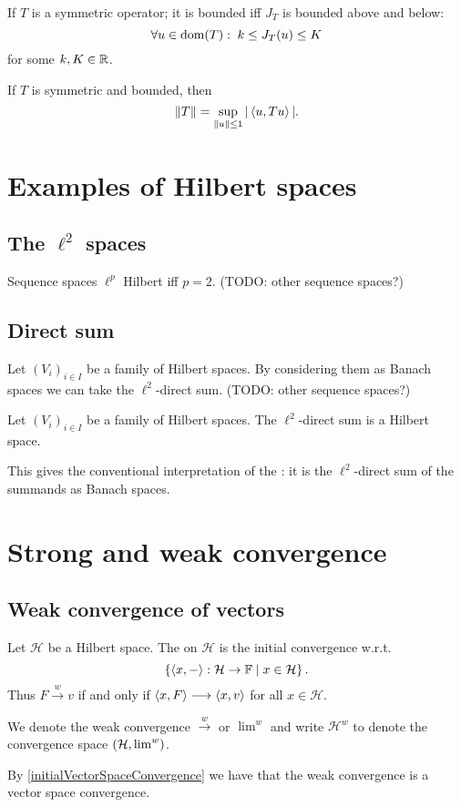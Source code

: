 \begin{corollary}
If $T$ is a symmetric operator; it is bounded iff $J_T$ is bounded above and below:
\[ \forall u\in\operatorname{dom}(T): \; k \leq J_T(u) \leq K \]
for some $k,K\in \mathbb{R}$.
\end{corollary}
\begin{corollary}
If $T$ is symmetric and bounded, then
\[ \lVert T\rVert = \sup_{\lVert u\rVert\leq 1} |\left\langle u,Tu \right\rangle|. \]
\end{corollary}








\section{Examples of Hilbert spaces}
\subsection{The $\ell^2$ spaces}
Sequence spaces $\ell^p$ Hilbert iff $p=2$. (TODO: other sequence spaces?)

\subsection{Direct sum}
Let $(V_i)_{i\in I}$ be a family of Hilbert spaces. By considering them as Banach spaces we can take the $\ell^2$-direct sum. (TODO: other sequence spaces?)
\begin{proposition}
Let $(V_i)_{i\in I}$ be a family of Hilbert spaces. The $\ell^2$-direct sum is a Hilbert space.
\end{proposition}
This gives the conventional interpretation of the : it is the $\ell^2$-direct sum of the summands as Banach spaces.

\section{Strong and weak convergence}
\subsection{Weak convergence of vectors}
\begin{definition}
Let $\mathcal{H}$ be a Hilbert space. The  on $\mathcal{H}$ is the initial convergence w.r.t.
\[ \left\{ \left\langle x,- \right\rangle: \mathcal{H}\to \mathbb{F} \;\middle|\; x\in\mathcal{H} \right\}. \]
Thus $F \overset{w}{\longrightarrow} v$ \textup{if and only if} $\left\langle x, F \right\rangle \longrightarrow \left\langle x,v \right\rangle$ for all $x\in\mathcal{H}$.

We denote the weak convergence $\overset{w}{\longrightarrow}$ or $\lim^w$ and write $\mathcal{H}^w$ to denote the convergence space $\left( \mathcal{H},\lim^w \right)$.
\end{definition}
By \ref{initialVectorSpaceConvergence} we have that the weak convergence is a vector space convergence.

